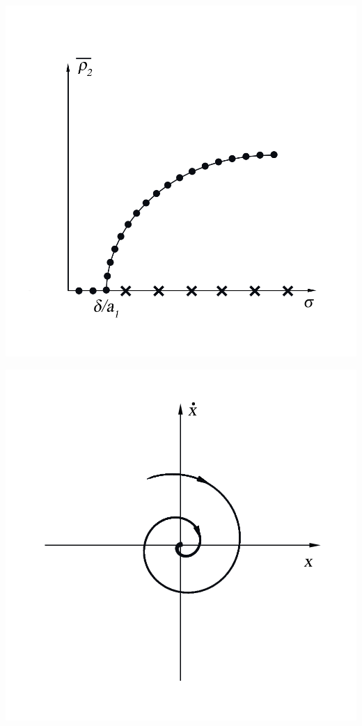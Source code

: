 \begin{center}
    \begin{minipage}{0.3\linewidth}
        \begin{minipage}[t]{\linewidth}
                \includegraphics[width=\linewidth]{pics/Ris6.png} 
                \vspace{0pt}
                \label{fig:6}
        \end{minipage}
    \end{minipage}
    \begin{minipage}[t]{0.6\linewidth}
            \begin{minipage}{0.45\linewidth}
                \includegraphics[width=\linewidth]{pics/Ris7a.png} 

\end{minipage}
\end{minipage}
\end{center}
